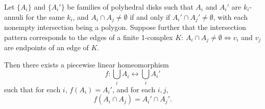 Let $\{A_i\}$ and $\{A_i'\}$ be families of polyhedral disks such that $A_i$ and $A_i'$ are $k_i$-annuli for the same $k_i$, and $A_i \cap A_j \neq \emptyset$ if and only if $A_i' \cap A_j' \neq \emptyset$, with each nonempty intersection being a polygon. Suppose further that the intersection pattern corresponds to the edges of a finite 1-complex $K$: $A_i \cap A_j \neq \emptyset \iff v_i$ and $v_j$ are endpoints of an edge of $K$.

Then there exists a piecewise linear homeomorphism
$$f : \bigcup_i A_i \leftrightarrow \bigcup_i A_i'$$
such that for each $i$, $f(A_i) = A_i'$, and for each $i,j$,
$$f(A_i \cap A_j) = A_i' \cap A_j'.$$
